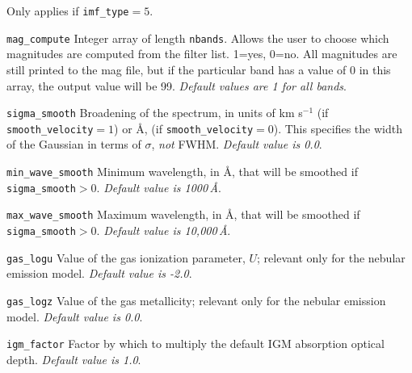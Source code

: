 \documentclass[]{article}
\begin{document}
\begin{itemize}
{  Only applies if \texttt{imf\_type}$=5$.
\item{\texttt{mag\_compute}} Integer array of length \texttt{nbands}. Allows the
  user to choose which magnitudes are computed from the filter list.  1=yes,
  0=no.  All magnitudes are still printed to the mag file, but if the particular
  band has a value of 0 in this array, the output value will be 99.
  {\it Default values are 1 for all bands}.
\item{\texttt{sigma\_smooth} Broadening of the spectrum, in units of km s$^{-1}$
  (if \texttt{smooth\_velocity}$=1$) or \AA, (if \texttt{smooth\_velocity}$=0$).
  This specifies the width of the Gaussian in terms of $\sigma$, {\it not} FWHM.
  {\it Default value is 0.0}.}
\item{\texttt{min\_wave\_smooth} Minimum wavelength, in \AA, that will be
  smoothed if \texttt{sigma\_smooth}$>0$.
  {\it Default value is 1000\,\AA}.}
\item{\texttt{max\_wave\_smooth} Maximum wavelength, in \AA, that will be
  smoothed if \texttt{sigma\_smooth}$>0$.
  {\it Default value is 10,000\,\AA}.}
\item{\texttt{gas\_logu} Value of the gas ionization parameter, $U$; relevant
  only for the nebular emission model.
  {\it Default value is -2.0}.}
\item{\texttt{gas\_logz} Value of the gas metallicity; relevant only for the
  nebular emission model.
  {\it Default value is 0.0}.}
\item{\texttt{igm\_factor}} Factor by which to multiply the default IGM
  absorption optical depth.
    {\it Default value is 1.0}.}
\end{itemize}

\vspace{0.5cm}
\end{document}
